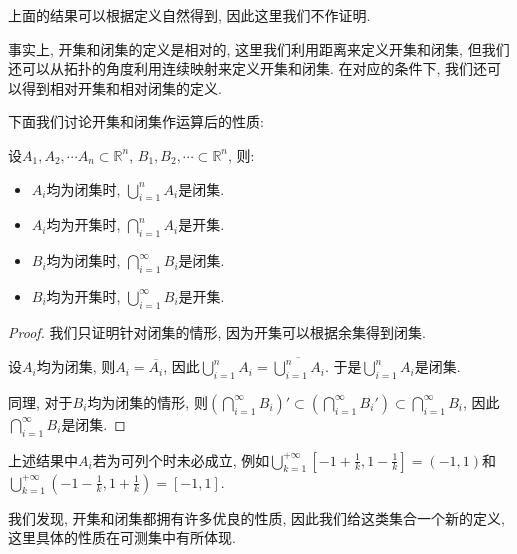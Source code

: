 \documentclass[theorem=false,mathfont=none,openany,sub3section]{easybook}
\begin{document}
\begin{remark}
  上面的结果可以根据定义自然得到, 因此这里我们不作证明.\par
  事实上, 开集和闭集的定义是相对的, 这里我们利用距离来定义开集和闭集, 但我们还可以从拓扑的角度利用连续映射来定义开集和闭集. 在对应的条件下, 我们还可以得到相对开集和相对闭集的定义.\par
\end{remark}

下面我们讨论开集和闭集作运算后的性质:\par

\begin{theorem}
  设$A_1,A_2,\cdots A_n \subset \mathbb{R}^n$, $B_1,B_2,\cdots \subset \mathbb{R}^n$, 则:\par
  \begin{itemize}
    \item $A_i$均为闭集时, $\bigcup_{i=1}^{n}A_i$是闭集.
    \item $A_i$均为开集时, $\bigcap_{i=1}^{n}A_i$是开集.
    \item $B_i$均为闭集时, $\bigcap_{i=1}^{\infty}B_i$是闭集.
    \item $B_i$均为开集时, $\bigcup_{i=1}^{\infty}B_i$是开集.
  \end{itemize}
\end{theorem}

\begin{proof}
  我们只证明针对闭集的情形, 因为开集可以根据余集得到闭集.\par
  设$A_i$均为闭集, 则$A_i=\overline{A_i}$, 因此$\bigcup_{i=1}^{n}A_i=\overline{\bigcup_{i=1}^{n}A_i}$. 于是$\bigcup_{i=1}^{n}A_i$是闭集.\par
  同理, 对于$B_i$均为闭集的情形, 则$\left(\bigcap_{i=1}^{\infty}B_i\right)'\subset \left(\bigcap_{i=1}^{\infty}B_i'\right)\subset \bigcap_{i=1}^{\infty}B_i$, 因此$\bigcap_{i=1}^{\infty}B_i$是闭集.\par
\end{proof}

\begin{remark}
  上述结果中$A_i$若为可列个时未必成立, 例如$\bigcup_{k=1}^{+\infty}\left[-1+\frac{1}{k},1-\frac{1}{k}\right]=(-1,1)$和$\bigcup_{k=1}^{+\infty}\left(-1-\frac{1}{k},1+\frac{1}{k}\right)=[-1,1]$.\par
\end{remark}

我们发现, 开集和闭集都拥有许多优良的性质, 因此我们给这类集合一个新的定义, 这里具体的性质在可测集中有所体现.\par
\end{document}
